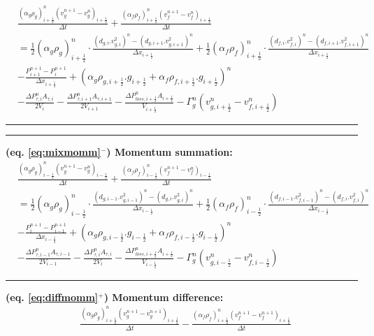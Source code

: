 \documentclass[11pt,letterpaper,titlepage]{article}
\newcommand{\half}{\frac{1}{2}}
\begin{document}
\begin{landscape}
\begin{equation*}
\begin{aligned}
&\frac{(\alpha_g\rho_g )_{i+\half}^{n} (v_g^{n+1}-v_g^{n})_{i+\half}}{\Delta t}+\frac{(\alpha_f\rho_f )_{i+\half}^{n} (v_f^{n+1}-v_f^{n})_{i+\half}}{\Delta t}\\
&=\half (\alpha_g \rho_{g})_{i+\half}^n \cdot\frac{(d_{g,i}.v_{g,i}^2)^n-(d_{g,i+1}.v_{g,i+1}^2)^n}{\Delta x_{i+\half}} 
+\half (\alpha_f \rho_{f})_{i+\half}^n \cdot\frac{(d_{f,i}.v_{f,i}^2)^n-(d_{f,i+1}.v_{f,i+1}^2)^n}{\Delta x_{i+\half}} \\
&-\frac{P_{i+1}^{n+1}-P_i^{n+1}}{\Delta x_{i+\half}} + (\alpha_g \rho_{g,i+\half}.g_{i+\half} + \alpha_f\rho_{f,i+\half}.g_{i+\half})^n\\
&-\frac{\Delta P_{\tau,i}^n A_{\tau,i}}{2V_i}-\frac{\Delta P_{\tau,i+1}^n A_{\tau,i+1}}{2V_{i+1}} 
-\frac{\Delta P_{loss,i+\half}^n A_{i+\half}}{V_{i+\half}} - \Gamma_g^n (v_{g,i+\half}^n - v_{f,i+\half}^n)
\end{aligned}
\end{equation*}
\noindent\rule{9in}{0.4pt}
\newpage
\noindent\rule{9in}{0.4pt}
\textbf{(eq. \ref{eq:mixmomm}$^-$) Momentum summation:}
\begin{equation*}
\begin{aligned}
&\frac{(\alpha_g\rho_g )_{i-\half}^{n} (v_g^{n+1}-v_g^{n})_{i-\half}}{\Delta t}+\frac{(\alpha_f\rho_f )_{i-\half}^{n} (v_f^{n+1}-v_f^{n})_{i-\half}}{\Delta t}\\
&=\half (\alpha_g \rho_{g})_{i-\half}^n \cdot\frac{(d_{g,i-1}.v_{g,i-1}^2)^n-(d_{g,i}.v_{g,i}^2)^n}{\Delta x_{i-\half}} 
+\half (\alpha_f \rho_{f})_{i-\half}^n \cdot\frac{(d_{f,i-1}.v_{f,i-1}^2)^n-(d_{f,i}.v_{f,i}^2)^n}{\Delta x_{i-\half}} \\
&-\frac{P_{i}^{n+1}-P_{i-1}^{n+1}}{\Delta x_{i-\half}} + (\alpha_g \rho_{g,i-\half}.g_{i-\half} + \alpha_f\rho_{f,i-\half}.g_{i-\half})^n\\
&-\frac{\Delta P_{\tau,i-1}^n A_{\tau,i-1}}{2V_{i-1}}-\frac{\Delta P_{\tau,i}^n A_{\tau,i}}{2V_{i}} 
-\frac{\Delta P_{loss,i+\half}^n A_{i+\half}}{V_{i-\half}} - \Gamma_g^n (v_{g,i-\half}^n - v_{f,i-\half}^n)
\end{aligned}
\end{equation*}
\noindent\rule{9in}{0.4pt}
\textbf{(eq. \ref{eq:diffmomm}$^+$) Momentum difference:}
\begin{equation*}
\begin{aligned}
&\frac{(\alpha_g\rho_g )_{i+\half}^n (v_g^{n+1} -v_g^{n+1})_{i+\half}}{\Delta t}
-\frac{(\alpha_f\rho_f )_{i+\half}^n (v_f^{n+1} -v_f^{n+1})_{i+\half}}{\Delta t}\\

\end{aligned}
\end{equation*}
\end{landscape}
\end{document}
